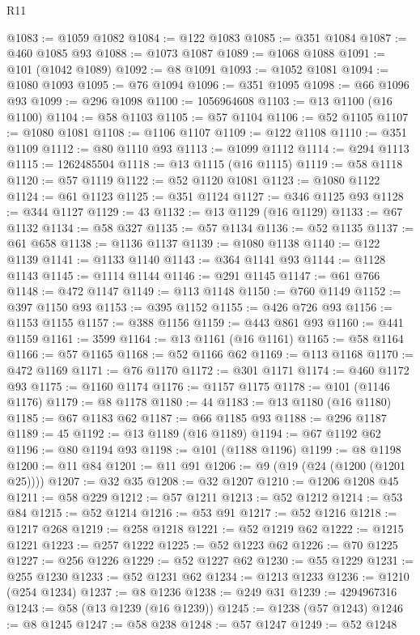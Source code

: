 \begin{lexlean}{R11}
\begin{coremodule}
@1083 := @1059 @1082
@1084 := @122 @1083
@1085 := @351 @1084
@1087 := @460 @1085 @93
@1088 := @1073 @1087
@1089 := @1068 @1088
@1091 := @101 (@1042 @1089)
@1092 := @8 @1091
@1093 := @1052 @1081
@1094 := @1080 @1093
@1095 := @76 @1094
@1096 := @351 @1095
@1098 := @66 @1096 @93
@1099 := @296 @1098
@1100 := 1056964608
@1103 := @13 @1100 (@16 @1100)
@1104 := @58 @1103
@1105 := @57 @1104
@1106 := @52 @1105
@1107 := @1080 @1081
@1108 := @1106 @1107
@1109 := @122 @1108
@1110 := @351 @1109
@1112 := @80 @1110 @93
@1113 := @1099 @1112
@1114 := @294 @1113
@1115 := 1262485504
@1118 := @13 @1115 (@16 @1115)
@1119 := @58 @1118
@1120 := @57 @1119
@1122 := @52 @1120 @1081
@1123 := @1080 @1122
@1124 := @61 @1123
@1125 := @351 @1124
@1127 := @346 @1125 @93
@1128 := @344 @1127
@1129 := 43
@1132 := @13 @1129 (@16 @1129)
@1133 := @67 @1132
@1134 := @58 @327
@1135 := @57 @1134
@1136 := @52 @1135
@1137 := @61 @658
@1138 := @1136 @1137
@1139 := @1080 @1138
@1140 := @122 @1139
@1141 := @1133 @1140
@1143 := @364 @1141 @93
@1144 := @1128 @1143
@1145 := @1114 @1144
@1146 := @291 @1145
@1147 := @61 @766
@1148 := @472 @1147
@1149 := @113 @1148
@1150 := @760 @1149
@1152 := @397 @1150 @93
@1153 := @395 @1152
@1155 := @426 @726 @93
@1156 := @1153 @1155
@1157 := @388 @1156
@1159 := @443 @861 @93
@1160 := @441 @1159
@1161 := 3599
@1164 := @13 @1161 (@16 @1161)
@1165 := @58 @1164
@1166 := @57 @1165
@1168 := @52 @1166 @62
@1169 := @113 @1168
@1170 := @472 @1169
@1171 := @76 @1170
@1172 := @301 @1171
@1174 := @460 @1172 @93
@1175 := @1160 @1174
@1176 := @1157 @1175
@1178 := @101 (@1146 @1176)
@1179 := @8 @1178
@1180 := 44
@1183 := @13 @1180 (@16 @1180)
@1185 := @67 @1183 @62
@1187 := @66 @1185 @93
@1188 := @296 @1187
@1189 := 45
@1192 := @13 @1189 (@16 @1189)
@1194 := @67 @1192 @62
@1196 := @80 @1194 @93
@1198 := @101 (@1188 @1196)
@1199 := @8 @1198
@1200 := @11 @84
@1201 := @11 @91
@1206 := @9 (@19 (@24 (@1200 (@1201 @25))))
@1207 := @32 @35
@1208 := @32 @1207
@1210 := @1206 @1208 @45
@1211 := @58 @229
@1212 := @57 @1211
@1213 := @52 @1212
@1214 := @53 @84
@1215 := @52 @1214
@1216 := @53 @91
@1217 := @52 @1216
@1218 := @1217 @268
@1219 := @258 @1218
@1221 := @52 @1219 @62
@1222 := @1215 @1221
@1223 := @257 @1222
@1225 := @52 @1223 @62
@1226 := @70 @1225
@1227 := @256 @1226
@1229 := @52 @1227 @62
@1230 := @55 @1229
@1231 := @255 @1230
@1233 := @52 @1231 @62
@1234 := @1213 @1233
@1236 := @1210 (@254 @1234)
@1237 := @8 @1236
@1238 := @249 @31
@1239 := 4294967316
@1243 := @58 (@13 @1239 (@16 @1239))
@1245 := @1238 (@57 @1243)
@1246 := @8 @1245
@1247 := @58 @238
@1248 := @57 @1247
@1249 := @52 @1248

\end{coremodule}
\end{lexlean}
